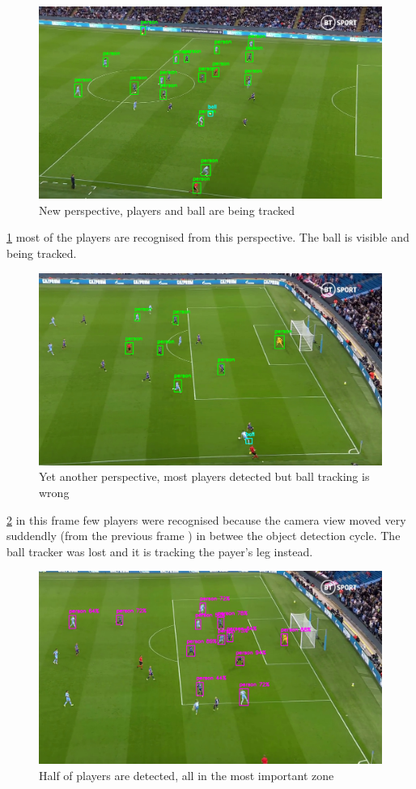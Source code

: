 \documentclass[
11pt,
twoside
]{report}
\begin{document}
\begin{figure}[H]
    \includegraphics[keepaspectratio, width=\columnwidth]{Screenshot_2022-03-03_23-10-58.png}
    \caption{New perspective, players and ball are being tracked}
    \label{img:14}
\end{figure}
\ref{img:14} most of
the players are recognised from this perspective. The ball is visible and being tracked.
\begin{figure}[H]
    \includegraphics[keepaspectratio, width=\columnwidth]{Screenshot_2022-03-03_23-12-29.png}
    \caption{Yet another perspective, most players detected but ball tracking is wrong}
    \label{img:15}
\end{figure}
\ref{img:15} in this
frame few players were recognised because the camera view moved very suddendly (from the previous frame ) in betwee the object detection cycle. The ball tracker was lost and it is tracking the payer's leg instead.
\begin{figure}[H]
    \includegraphics[keepaspectratio, width=\columnwidth]{Screenshot_2022-03-03_23-13-18.png}
    \caption{Half of players are detected, all in the most important zone}
    \label{img:16}
\end{figure}
\end{document}
